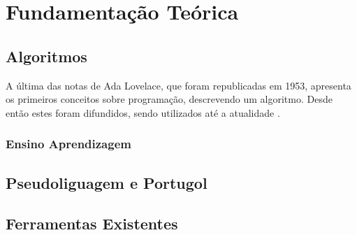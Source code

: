 
\chapter{Fundamentação Teórica}

\section{Algoritmos}

A última das notas de Ada Lovelace, que foram republicadas em 1953, apresenta os
primeiros conceitos sobre programação, descrevendo um algoritmo. Desde então
estes foram difundidos, sendo utilizados até a atualidade
\cite{santiago2003etal}.




\subsection{Ensino Aprendizagem}


\section{Pseudoliguagem e Portugol}

\section{Ferramentas Existentes}

